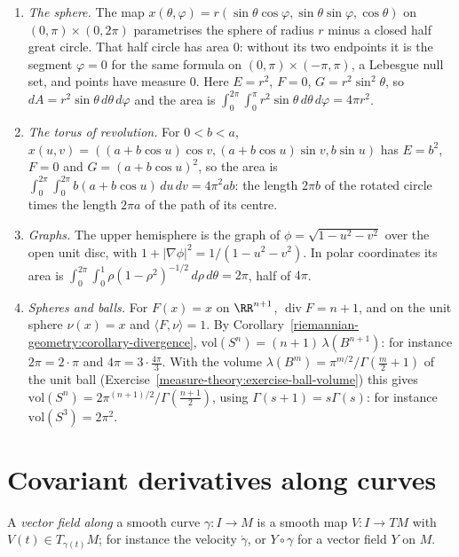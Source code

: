\begin{example}\label{riemannian-geometry:example-areas}
\begin{enumerate}
\item \emph{The sphere.} The map $x(\theta, \varphi) = r(\sin\theta\cos\varphi, \sin\theta\sin\varphi, \cos\theta)$ on $(0, \pi) \times (0, 2\pi)$ parametrises the sphere of
radius $r$ minus a closed half great circle. That half circle has area $0$: without its two endpoints it is the segment $\varphi = 0$ for the same formula on
$(0, \pi) \times (-\pi, \pi)$, a Lebesgue null set, and points have measure $0$. Here $E = r^2$, $F = 0$, $G = r^2\sin^2\theta$, so $dA = r^2\sin\theta\,d\theta\,d\varphi$
and the area is $\int_0^{2\pi}\int_0^\pi r^2\sin\theta\,d\theta\,d\varphi = 4\pi r^2$.
\item \emph{The torus of revolution.} For $0 < b < a$, $x(u, v) = ((a + b\cos u)\cos v, (a + b\cos u)\sin v, b\sin u)$ has $E = b^2$, $F = 0$ and
$G = (a + b\cos u)^2$, so the area is $\int_0^{2\pi}\int_0^{2\pi}b(a + b\cos u)\,du\,dv = 4\pi^2ab$: the length $2\pi b$ of the rotated circle times the length $2\pi a$
of the path of its centre.
\item \emph{Graphs.} The upper hemisphere is the graph of $\phi = \sqrt{1 - u^2 - v^2}$ over the open unit disc, with $1 + |\nabla\phi|^2 = 1/(1 - u^2 - v^2)$. In polar
coordinates its area is $\int_0^{2\pi}\int_0^1\rho(1 - \rho^2)^{-1/2}\,d\rho\,d\theta = 2\pi$, half of $4\pi$.
\item \emph{Spheres and balls.} For $F(x) = x$ on $\RR^{n+1}$, $\operatorname{div}F = n + 1$, and on the unit sphere $\nu(x) = x$ and $\langle F, \nu\rangle = 1$. By
Corollary~\ref{riemannian-geometry:corollary-divergence}, $\mathrm{vol}(S^n) = (n + 1)\,\lambda(B^{n+1})$: for instance $2\pi = 2 \cdot \pi$ and
$4\pi = 3 \cdot \frac{4\pi}{3}$. With the volume $\lambda(B^m) = \pi^{m/2}/\Gamma(\frac m2 + 1)$ of the unit ball (Exercise~\ref{measure-theory:exercise-ball-volume}) this gives
$\mathrm{vol}(S^n) = 2\pi^{(n+1)/2}/\Gamma(\frac{n+1}2)$, using $\Gamma(s + 1) = s\Gamma(s)$: for instance $\mathrm{vol}(S^3) = 2\pi^2$.
\end{enumerate}
\end{example}

\section{Covariant derivatives along curves}\label{riemannian-geometry:section-along-curves}

A \emph{vector field along} a smooth curve $\gamma \colon I \to M$ is a smooth map $V \colon I \to TM$ with $V(t) \in T_{\gamma(t)}M$; for instance the velocity $\dot\gamma$, or $Y \circ \gamma$ for a vector field $Y$ on $M$.


